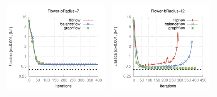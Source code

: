 \begin{figure}
\begin{tabular}{cc}
\includegraphics[scale=0.4]{figures/chapter9/free-elastica/plots/iteration/radius_choice/len_pen_0.001/radius-7/flower.pdf} & 
\includegraphics[scale=0.4]{figures/chapter9/free-elastica/plots/iteration/radius_choice/len_pen_0.001/radius-12/flower.pdf}
\end{tabular}
\caption{}
\label{ch9:fig:plots-free-elastica-radius-choice}
\end{figure}



